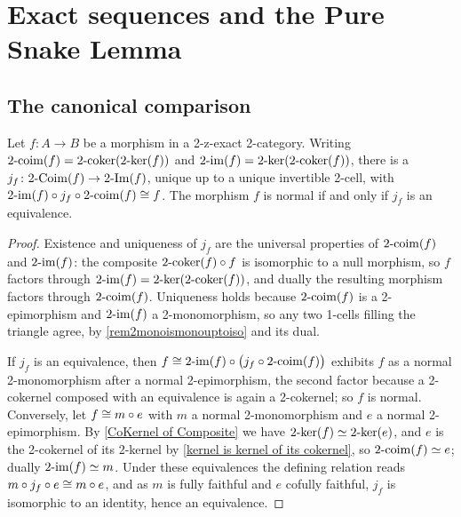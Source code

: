 \section{Exact sequences and the Pure Snake Lemma}\label{S:Exact}

\subsection{The canonical comparison}\label{SS:Comparison}

\begin{lemma}
  \label{Normal Iff Comparison Iso}   \leanok
  Let \(f\colon A\to B\) be a morphism in a 2-z-exact 2-category. Writing \(2\text{-}\mathrm{coim}(f)=2\text{-}\mathrm{coker}(2\text{-}\mathrm{ker}(f))\) and \(2\text{-}\mathrm{im}(f)=2\text{-}\mathrm{ker}(2\text{-}\mathrm{coker}(f))\), there is a  \(j_f\colon2\text{-}\mathrm{Coim}(f)\to2\text{-}\mathrm{Im}(f)\), unique up to a unique invertible 2-cell, with \(2\text{-}\mathrm{im}(f)\circ j_f\circ2\text{-}\mathrm{coim}(f)\cong f\). The morphism \(f\) is normal if and only if \(j_f\) is an equivalence.
\end{lemma}

\begin{proof}
  \leanok
  Existence and uniqueness of \(j_f\) are the universal properties of \(2\text{-}\mathrm{coim}(f)\) and \(2\text{-}\mathrm{im}(f)\): the composite \(2\text{-}\mathrm{coker}(f)\circ f\) is isomorphic to a null morphism, so \(f\) factors through \(2\text{-}\mathrm{im}(f)=2\text{-}\mathrm{ker}(2\text{-}\mathrm{coker}(f))\), and dually the resulting morphism factors through \(2\text{-}\mathrm{coim}(f)\). Uniqueness holds because \(2\text{-}\mathrm{coim}(f)\) is a 2-epimorphism and \(2\text{-}\mathrm{im}(f)\) a 2-monomorphism, so any two 1-cells filling the triangle agree, by \remx\ref{rem2monoismonouptoiso} and its dual.

	If \(j_f\) is an equivalence, then \(f\cong2\text{-}\mathrm{im}(f)\circ\bigl(j_f\circ2\text{-}\mathrm{coim}(f)\bigr)\) exhibits \(f\) as a normal 2-monomorphism after a normal 2-epimorphism, the second factor because a 2-cokernel composed with an equivalence is again a 2-cokernel; so \(f\) is normal. Conversely, let \(f\cong m\circ e\) with \(m\) a normal 2-monomorphism and \(e\) a normal 2-epimorphism. By \prox\ref{CoKernel of Composite} we have \(2\text{-}\mathrm{ker}(f)\simeq2\text{-}\mathrm{ker}(e)\), and \(e\) is the 2-cokernel of its 2-kernel by \prox\ref{kernel is kernel of its cokernel}, so \(2\text{-}\mathrm{coim}(f)\simeq e\); dually \(2\text{-}\mathrm{im}(f)\simeq m\). Under these equivalences the defining relation reads \(m\circ j_f\circ e\cong m\circ e\), and as \(m\) is fully faithful and \(e\) cofully faithful, \(j_f\) is isomorphic to an identity, hence an equivalence.
\end{proof}

